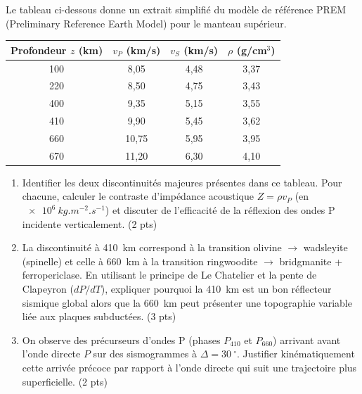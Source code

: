 \documentclass[11pt]{article}
\providecommand{\degree}{^{\circ}}
\begin{document}
\begin{exercice}
Le tableau ci-dessous donne un extrait simplifié du modèle de référence PREM (Preliminary Reference Earth Model) pour le manteau supérieur.

\begin{center}
\begin{tabular}{c|c|c|c}
Profondeur $z$ (km) & $v_P$ (km/s) & $v_S$ (km/s) & $\rho$ (g/cm$^3$) \\
\hline
100 & 8,05 & 4,48 & 3,37 \\
220 & 8,50 & 4,75 & 3,43 \\
400 & 9,35 & 5,15 & 3,55 \\
410 & 9,90 & 5,45 & 3,62 \\
660 & 10,75 & 5,95 & 3,95 \\
670 & 11,20 & 6,30 & 4,10 \\
\end{tabular}
\end{center}

\begin{enumerate}
    \item Identifier les deux discontinuités majeures présentes dans ce tableau. Pour chacune, calculer le contraste d'impédance acoustique $Z = \rho v_P$ (en $\SI{e6}{kg.m^{-2}.s^{-1}}$) et discuter de l'efficacité de la réflexion des ondes P incidente verticalement. (2 pts)
    \item La discontinuité à \SI{410}{km} correspond à la transition olivine $\to$ wadsleyite (spinelle) et celle à \SI{660}{km} à la transition ringwoodite $\to$ bridgmanite + ferropericlase. En utilisant le principe de Le Chatelier et la pente de Clapeyron ($dP/dT$), expliquer pourquoi la \SI{410}{km} est un bon réflecteur sismique global alors que la \SI{660}{km} peut présenter une topographie variable liée aux plaques subductées. (3 pts)
    \item On observe des précurseurs d'ondes P (phases $P_{410}$ et $P_{660}$) arrivant avant l'onde directe $P$ sur des sismogrammes à $\Delta = \SI{30}{\degree}$. Justifier kinématiquement cette arrivée précoce par rapport à l'onde directe qui suit une trajectoire plus superficielle. (2 pts)
\end{enumerate}
\end{exercice}
\end{document}
